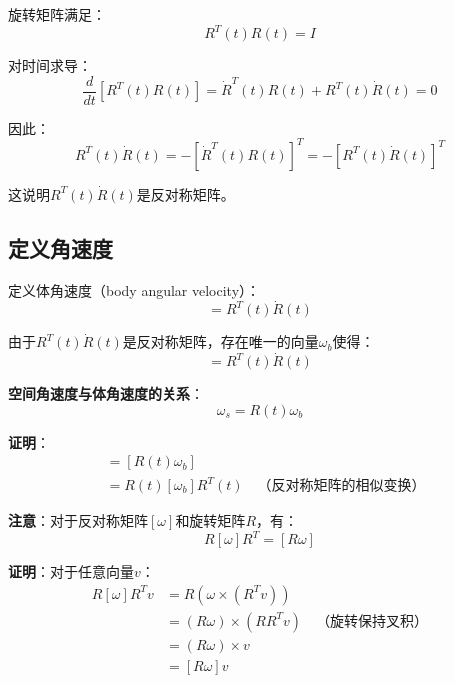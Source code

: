 \documentclass[12pt,a4paper]{article}
\begin{document}
旋转矩阵满足：
\begin{equation}
R^T(t) R(t) = I
\end{equation}

对时间求导：
\begin{equation}
\frac{d}{dt}[R^T(t) R(t)] = \dot{R}^T(t) R(t) + R^T(t) \dot{R}(t) = 0
\end{equation}

因此：
\begin{equation}
R^T(t) \dot{R}(t) = -[\dot{R}^T(t) R(t)]^T = -[R^T(t) \dot{R}(t)]^T
\end{equation}

这说明$R^T(t) \dot{R}(t)$是反对称矩阵。

\subsection{定义角速度}

定义体角速度（body angular velocity）：
\begin{equation}
[\omega_b] = R^T(t) \dot{R}(t)
\end{equation}

由于$R^T(t) \dot{R}(t)$是反对称矩阵，存在唯一的向量$\omega_b$使得：
\begin{equation}
[\omega_b] = R^T(t) \dot{R}(t)
\end{equation}

\textbf{空间角速度与体角速度的关系}：
\begin{equation}
\omega_s = R(t) \omega_b
\end{equation}

\textbf{证明}：
\begin{align}
[\omega_s] &= [R(t) \omega_b] \\
&= R(t) [\omega_b] R^T(t) \quad \text{（反对称矩阵的相似变换）}
\end{align}

\textbf{注意}：对于反对称矩阵$[\omega]$和旋转矩阵$R$，有：
\begin{equation}
R [\omega] R^T = [R \omega]
\end{equation}

\textbf{证明}：对于任意向量$v$：
\begin{align}
R [\omega] R^T v &= R (\omega \times (R^T v)) \\
&= (R \omega) \times (R R^T v) \quad \text{（旋转保持叉积）} \\
&= (R \omega) \times v \\
&= [R \omega] v
\end{align}
\end{document}
